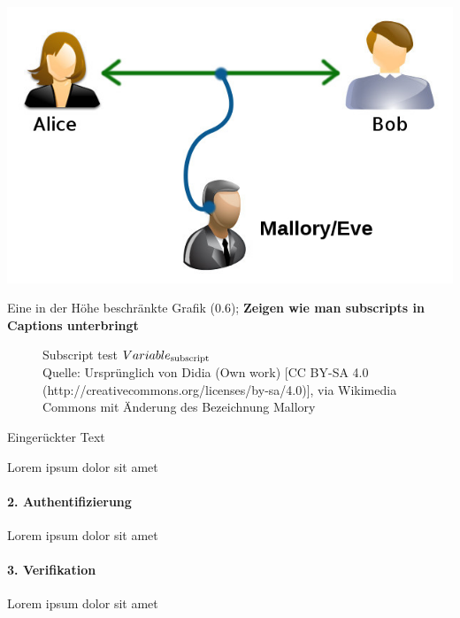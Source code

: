 \begin{center}
\begin{minipage}[c]{0.8\textwidth}
	\includegraphics{res/Alice-bob-eve}
	\label{alicebob-2}
\end{minipage}
\end{center}


\begin{formal}
	Eine in der Höhe beschränkte Grafik (0.6); \textbf{Zeigen wie man subscripts in Captions unterbringt}
\end{formal}
\begin{figure}[h!]
	\centering
     \caption[Subscript in caption]{Subscript test \mbox{$Variable_{\textnormal{subscript}}$}\\
	\footnotesize{Quelle: Ursprünglich von Didia (Own work) [CC BY-SA 4.0 (http://creativecommons.org/licenses/by-sa/4.0)], via Wikimedia Commons mit Änderung des Bezeichnung Mallory \cite{alicebobeve}}}
	\label{key-upload-flowchart-section}
\end{figure}
\clearpage

\begin{formal}
	Eingerückter Text
\end{formal}

\begin{adjustwidth}{1em}{0em}

Lorem ipsum dolor sit amet

\paragraph{2. Authentifizierung}
Lorem ipsum dolor sit amet

\paragraph{3. Verifikation}
Lorem ipsum dolor sit amet

\end{adjustwidth}


